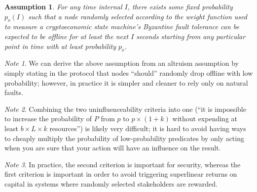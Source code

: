 \documentclass[11pt,a4paper]{report}
\theoremstyle{plain}
\newtheorem{assm}{Assumption}[chapter]
\theoremstyle{definition}
\theoremstyle{remark}
\newtheorem*{note}{Note}
\begin{document}
\begin{assm}
For any time internal $I$, there exists some fixed probability $p_o(I)$ such that a node randomly selected according to the weight function used to measure a cryptoeconomic state machine's Byzantine fault tolerance can be expected to be offline for at least the next $I$ seconds starting from any particular point in time with at least probability $p_o$.
\end{assm}

\begin{note}
We can derive the above assumption from an altruism assumption by simply stating in the protocol that nodes ``should'' randomly drop offline with low probability; however, in practice it is simpler and cleaner to rely only on natural faults.
\end{note}

\begin{note}
Combining the two uninfluenceability criteria into one (``it is impossible to increase the probability of $P$ from $p$ to $p \times  (1 + k)$ without expending at least $b \times  L \times  k$ resources'') is likely very difficult; it is hard to avoid having ways to cheaply multiply the probability of low-probability predicates by only acting when you are sure that your action will have an influence on the result. 
\end{note}

\begin{note}
In practice, the second criterion is important for security, whereas the first criterion is important in order to avoid triggering superlinear returns on capital in systems where randomly selected stakeholders are rewarded.
\end{note}
\end{document}
